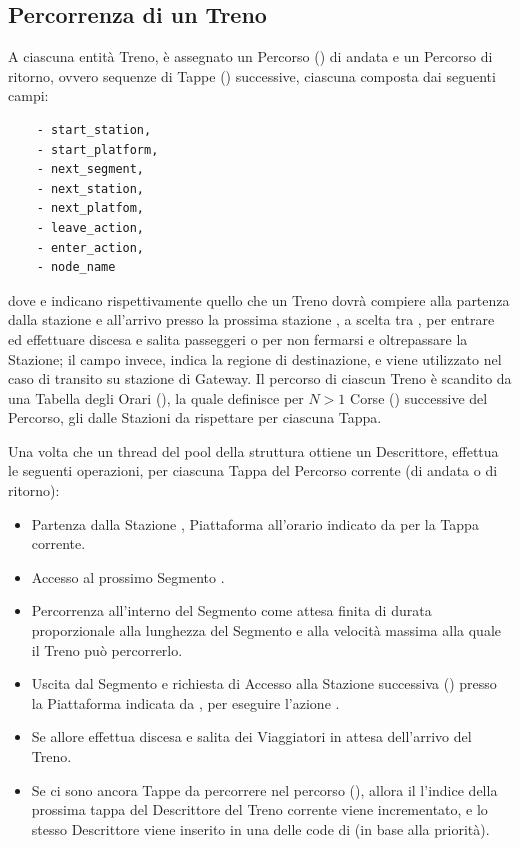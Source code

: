 	\subsection{Percorrenza di un Treno}
	
	A ciascuna entità Treno, è assegnato un Percorso () di andata e un Percorso di ritorno, ovvero sequenze di Tappe () successive, ciascuna composta dai seguenti campi:
				\begin{center}
					\begin{verbatim}
    - start_station,
    - start_platform,
    - next_segment,
    - next_station,
    - next_platfom,
    - leave_action,
    - enter_action,
    - node_name
					\end{verbatim}
				\end{center}
dove  e  indicano rispettivamente quello che un Treno dovrà compiere alla partenza dalla stazione  e all'arrivo presso la prossima stazione , a scelta tra , per entrare ed effettuare discesa e salita passeggeri o  per non fermarsi e oltrepassare la Stazione; il campo  invece, indica la regione di destinazione, e viene utilizzato nel caso di transito su stazione di Gateway.
	Il percorso di ciascun Treno è scandito da una Tabella degli Orari (), la quale definisce per $N>1$ Corse () successive del Percorso, gli  dalle Stazioni da rispettare per ciascuna Tappa. 
	 
Una volta che un thread del pool della struttura  ottiene un Descrittore, effettua le seguenti  operazioni, per ciascuna Tappa del Percorso corrente (di andata o di ritorno):
				\begin{itemize} 
					\item Partenza dalla Stazione , Piattaforma  all'orario indicato da  per la Tappa corrente.
					\item Accesso al prossimo Segmento .
					\item Percorrenza all'interno del Segmento come attesa finita di durata proporzionale alla lunghezza del Segmento e alla velocità massima alla quale il Treno può percorrerlo.
					\item Uscita dal Segmento e richiesta di Accesso alla Stazione successiva () presso la Piattaforma indicata da , per eseguire l'azione .
					\item Se  allore effettua discesa e salita dei Viaggiatori in attesa dell'arrivo del Treno.
					\item Se ci sono ancora Tappe da percorrere nel percorso (), allora il l'indice della prossima tappa del Descrittore del Treno corrente viene incrementato, e lo stesso Descrittore viene inserito in una delle code di  (in base alla priorità). 
				\end{itemize}


